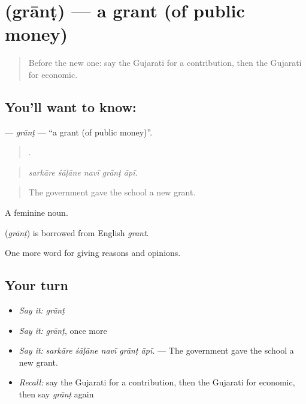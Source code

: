 \section[\texorpdfstring{\gu{ગ્રાન્ટ} (grānṭ)}{ગ્રાન્ટ (grānṭ)}]{ (grānṭ) — a grant (of public money)}

\label{lesson:GU-C355-grant}



\begin{quote}
Before the new one: say the Gujarati for a contribution, then the Gujarati for economic.
\end{quote}

\subsection*{You'll want to know: }
\textbf{} — \emph{grānṭ} — \textquotedblleft{}a grant (of public money)\textquotedblright{}.

\begin{quote}
    .
\end{quote}

\begin{quote}
\emph{sarkāre śāḷāne navī grānṭ āpī.}
\end{quote}

\begin{quote}
The government gave the school a new grant.
\end{quote}

A feminine noun.

\begin{cousinweb}
\textbf{} (\emph{grānṭ}) is borrowed from English \emph{grant}.
\end{cousinweb}

\begin{grammarlens}[title={What you've built}]
One more word for giving reasons and opinions.
\end{grammarlens}

\subsection*{Your turn}
\begin{itemize}
\raggedright
  \item \emph{Say it:} \emph{grānṭ}
  \item \emph{Say it:} \emph{grānṭ}, once more
  \item \emph{Say it:} \emph{sarkāre śāḷāne navī grānṭ āpī.} — The government gave the school a new grant.
  \item \emph{Recall:} say the Gujarati for a contribution, then the Gujarati for economic, then say \emph{grānṭ} again
\end{itemize}

